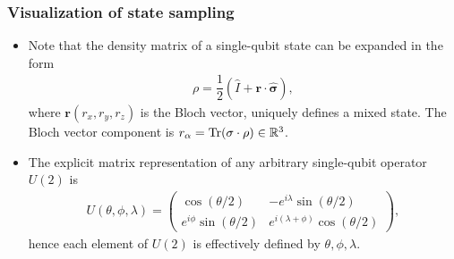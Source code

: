 \documentclass{beamer}
\begin{document}
\begin{frame}
  \frametitle{Visualization of state sampling}
  \begin{itemize}
    \item Note that the density matrix of a single-qubit state can be expanded in the form 
    \begin{align} 
      \rho = \dfrac{1}{2}(\hat{I} +\mathbf{r}\cdot\hat{\mathbf{\sigma}}),
    \end{align}
    where $\mathbf{r}(r_x,r_y, r_z)$ is the Bloch vector, uniquely defines a mixed state. The Bloch vector component is $r_\alpha=\Tr(\sigma\cdot\rho)\in\mathbb{R}^3$.
    \item The explicit matrix representation of any arbitrary single-qubit operator $U(2)$ is 
    \begin{align}
      U(\theta,\phi,\lambda) = \begin{pmatrix}
        \cos(\theta/2) & -e^{i\lambda}\sin(\theta/2) \\
        e^{i\phi}\sin(\theta/2) & e^{i(\lambda+\phi)}\cos(\theta/2)
      \end{pmatrix},
    \end{align}
    hence each element of $U(2)$ is effectively defined by $\theta,\phi,\lambda$.
  \end{itemize}
\end{frame}
\end{document}
